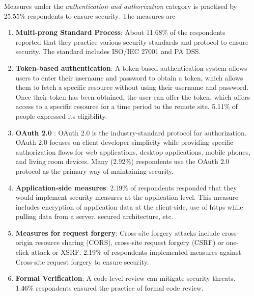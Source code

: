 Measures under the \emph{authentication and authorization} category is practised by 25.55\% respondents to ensure security. The measures are 
\begin{enumerate}[label=(\alph*)]

    \item \textbf{Multi-prong Standard Process}: About 11.68\% of the respondents reported that they practice various security standards and protocol to ensure security. The standard includes ISO/IEC 27001 and PA DSS.
    
    \item \textbf{Token-based authentication}: A token-based authentication system allows users to enter their username and password to obtain a token, which allows them to fetch a specific resource without using their username and password. Once their token has been obtained, the user can offer the token, which offers access to a specific resource for a time period to the remote site. 5.11\% of people expressed its eligibility.
    
    \item \textbf{OAuth 2.0} : OAuth 2.0 is the industry-standard protocol for authorization. OAuth 2.0 focuses on client developer simplicity while providing specific authorization flows for web applications, desktop applications, mobile phones, and living room devices. Many (2.92\%) respondents use the OAuth 2.0 protocol as the primary way of maintaining security.
    
    \item \textbf{Application-side measures}: 2.19\% of respondents responded that they would implement security measures at the application level. This measure includes encryption of application data at the client-side, use of https while pulling data from a server, secured architecture, etc.
    
    \item \textbf{Measures for request forgery}: Cross-site forgery attacks include cross-origin resource sharing (CORS), cross-site request forgery (CSRF) or one-click attack or XSRF. 2.19\% of respondents implemented measures against  Cross-site request forgery to ensure security.
    
    \item \textbf{Formal Verification}: A code-level review can mitigate security threats. 1.46\% respondents ensured the practice of formal code review.
    
\end{enumerate}

